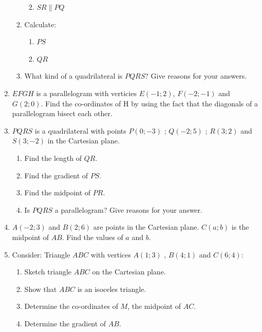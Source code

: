 \begin{enumerate}[noitemsep, label=\textbf{\arabic*}. ]
\begin{enumerate}[noitemsep, label=\textbf{\alph*}. ]
\begin{enumerate}[noitemsep, label=\textbf{\roman*}. ]
\label{m39167*uid63}\item $SR \parallel PQ$
\end{enumerate}
        \label{m39167*uid64}\item Calculate:
\label{m39167*id69993}\begin{enumerate}[noitemsep, label=\textbf{\roman*}. ] 
            \label{m39167*uid65}\item $PS$
\label{m39167*uid66}\item $QR$
\end{enumerate}
        \label{m39167*uid67}\item What kind of a quadrilateral is $PQRS$? Give reasons for your answers.
\end{enumerate}
                \label{m39167*uid68}\item $EFGH$ is a parallelogram with verticies $E(-1;2)$, $F(-2;-1)$ and $G(2;0)$. Find the co-ordinates of H by using the fact that the diagonals of a parallelogram bisect each other.\newline
\item  
$PQRS$ is a quadrilateral with points $P(0;-3)$ ; $Q(-2;5)$ ; $R(3;2)$ and $S(3;-2)$  in the Cartesian plane.
\label{m39167*id0812312}\begin{enumerate}[noitemsep, label=\textbf{\alph*}. ] 
            \label{m39167*id08123}\item Find the length of $QR$.
\label{m39167*id981221}\item Find the gradient of $PS$.
\label{m39167*id08213}\item Find the midpoint of $PR$.
\label{m39167*id9871293}\item Is $PQRS$ a parallelogram?  Give reasons for your answer. \end{enumerate}
                \item $A(-2;3)$ and $B(2;6)$ are points in the Cartesian plane. $C(a;b)$ is the midpoint of $AB$. Find the values of $a$ and $b$.
\item 
Consider: Triangle $ABC$ with vertices $A(1; 3)$ , $B(4;1)$ and $C (6; 4)$:
\label{m39167*id9173123}\begin{enumerate}[noitemsep, label=\textbf{\alph*}. ] 
            \item Sketch triangle $ABC$ on the Cartesian plane. 
\item Show that $ABC$ is an isoceles triangle.
\item Determine the co-ordinates of $M$, the midpoint of $AC$.
\item Determine the gradient of $AB$.

\end{enumerate}
\end{enumerate}
